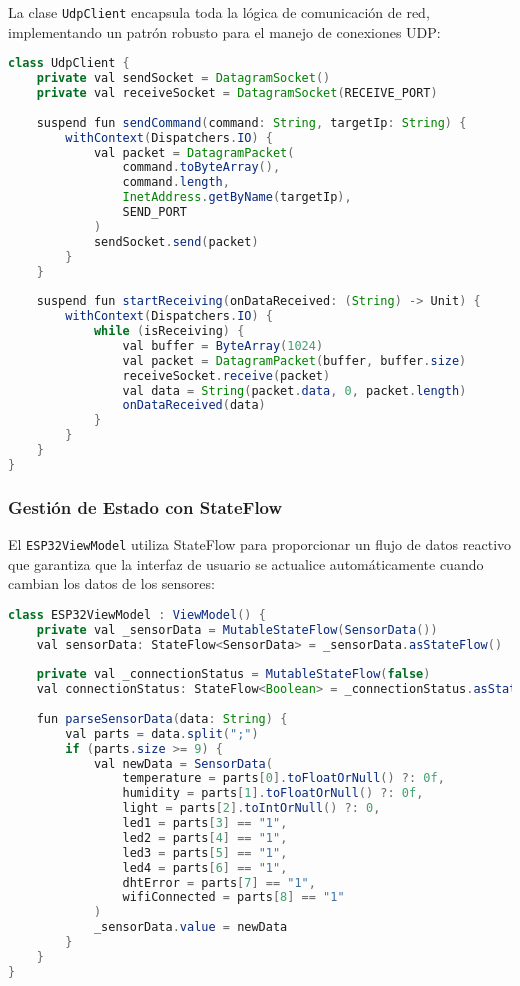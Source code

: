 \documentclass[conference,a4paper]{IEEEtran}
\begin{document}
La clase \texttt{UdpClient} encapsula toda la l\'ogica de comunicaci\'on de red, implementando un patr\'on robusto para el manejo de conexiones UDP:

\begin{lstlisting}[style=arduino, caption=Estructura del cliente UDP en Kotlin, language=Java]
class UdpClient {
    private val sendSocket = DatagramSocket()
    private val receiveSocket = DatagramSocket(RECEIVE_PORT)
    
    suspend fun sendCommand(command: String, targetIp: String) {
        withContext(Dispatchers.IO) {
            val packet = DatagramPacket(
                command.toByteArray(),
                command.length,
                InetAddress.getByName(targetIp),
                SEND_PORT
            )
            sendSocket.send(packet)
        }
    }
    
    suspend fun startReceiving(onDataReceived: (String) -> Unit) {
        withContext(Dispatchers.IO) {
            while (isReceiving) {
                val buffer = ByteArray(1024)
                val packet = DatagramPacket(buffer, buffer.size)
                receiveSocket.receive(packet)
                val data = String(packet.data, 0, packet.length)
                onDataReceived(data)
            }
        }
    }
}
\end{lstlisting}

\subsubsection{Gesti\'on de Estado con StateFlow}

El \texttt{ESP32ViewModel} utiliza StateFlow para proporcionar un flujo de datos reactivo que garantiza que la interfaz de usuario se actualice autom\'aticamente cuando cambian los datos de los sensores:

\begin{lstlisting}[style=arduino, caption=ViewModel con StateFlow, language=Java]
class ESP32ViewModel : ViewModel() {
    private val _sensorData = MutableStateFlow(SensorData())
    val sensorData: StateFlow<SensorData> = _sensorData.asStateFlow()
    
    private val _connectionStatus = MutableStateFlow(false)
    val connectionStatus: StateFlow<Boolean> = _connectionStatus.asStateFlow()
    
    fun parseSensorData(data: String) {
        val parts = data.split(";")
        if (parts.size >= 9) {
            val newData = SensorData(
                temperature = parts[0].toFloatOrNull() ?: 0f,
                humidity = parts[1].toFloatOrNull() ?: 0f,
                light = parts[2].toIntOrNull() ?: 0,
                led1 = parts[3] == "1",
                led2 = parts[4] == "1",
                led3 = parts[5] == "1",
                led4 = parts[6] == "1",
                dhtError = parts[7] == "1",
                wifiConnected = parts[8] == "1"
            )
            _sensorData.value = newData
        }
    }
}
\end{lstlisting}
\end{document}
